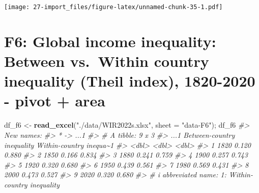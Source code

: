 \documentclass[
  xelatex, ja=standard]{bxjsbook}
\newenvironment{Shaded}{\begin{snugshade}}{\end{snugshade}}
\newcommand{\AttributeTok}[1]{\textcolor[rgb]{0.13,0.29,0.53}{#1}}
\newcommand{\CommentTok}[1]{\textcolor[rgb]{0.56,0.35,0.01}{\textit{#1}}}
\newcommand{\FunctionTok}[1]{\textcolor[rgb]{0.13,0.29,0.53}{\textbf{#1}}}
\newcommand{\NormalTok}[1]{#1}
\newcommand{\OtherTok}[1]{\textcolor[rgb]{0.56,0.35,0.01}{#1}}
\newcommand{\StringTok}[1]{\textcolor[rgb]{0.31,0.60,0.02}{#1}}
\theoremstyle{definition}
\theoremstyle{definition}
\theoremstyle{definition}
\theoremstyle{definition}
\theoremstyle{remark}
\begin{document}
\texttt{[image: 27-import\_files/figure-latex/unnamed-chunk-35-1.pdf]}

\hypertarget{f6-global-income-inequality-between-vs.-within-country-inequality-theil-index-1820-2020---pivot-area}{%
\section{F6: Global income inequality: Between vs.~Within country inequality (Theil index), 1820-2020 - pivot + area}\label{f6-global-income-inequality-between-vs.-within-country-inequality-theil-index-1820-2020---pivot-area}}

\begin{Shaded}
\begin{Highlighting}[]
\NormalTok{df\_f6 }\OtherTok{\textless{}{-}} \FunctionTok{read\_excel}\NormalTok{(}\StringTok{"./data/WIR2022s.xlsx"}\NormalTok{, }\AttributeTok{sheet =} \StringTok{"data{-}F6"}\NormalTok{); df\_f6}
\CommentTok{\#\textgreater{} New names:}
\CommentTok{\#\textgreater{} * \textasciigrave{}\textasciigrave{} {-}\textgreater{} \textasciigrave{}...1\textasciigrave{}}
\CommentTok{\#\textgreater{} \# A tibble: 9 x 3}
\CommentTok{\#\textgreater{}    ...1 \textasciigrave{}Between{-}country inequality\textasciigrave{} Within{-}country inequa\textasciitilde{}1}
\CommentTok{\#\textgreater{}   \textless{}dbl\textgreater{}                        \textless{}dbl\textgreater{}                   \textless{}dbl\textgreater{}}
\CommentTok{\#\textgreater{} 1  1820                        0.120                   0.880}
\CommentTok{\#\textgreater{} 2  1850                        0.166                   0.834}
\CommentTok{\#\textgreater{} 3  1880                        0.241                   0.759}
\CommentTok{\#\textgreater{} 4  1900                        0.257                   0.743}
\CommentTok{\#\textgreater{} 5  1920                        0.320                   0.680}
\CommentTok{\#\textgreater{} 6  1950                        0.439                   0.561}
\CommentTok{\#\textgreater{} 7  1980                        0.569                   0.431}
\CommentTok{\#\textgreater{} 8  2000                        0.473                   0.527}
\CommentTok{\#\textgreater{} 9  2020                        0.320                   0.680}
\CommentTok{\#\textgreater{} \# i abbreviated name: 1: \textasciigrave{}Within{-}country inequality\textasciigrave{}}
\end{Highlighting}
\end{Shaded}
\end{document}
